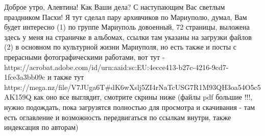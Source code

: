  
 
 
 
 

Доброе утро, Алевтина! Как Ваши дела? С наступающим Вас светлым праздником
Пасхи! Я тут сделал пару архивчиков по Мариуполю, думал, Вам будет интересно
(1) по группе Мариуполь довоенный, 72 страницы, выложена здесь у меня на
страничке в альбомах, ссылки там указаны на загрузки файлов (2) в основном по
культурной жизни Мариуполя, но есть также и посты с прерасными фотографическими
работами, вот тут -
https://acrobat.adobe.com/id/urn:aaid:sc:EU:4ecce413-b27c-4216-9cd7-1fce3a3bb09c
и также тут
https://mega.nz/file/V7JUga6T#dK6wXslj5ZI4rNaTcUSG7R1M93QH3oa54O5c5AK159Q как
оно все выглядит, смотрите скрины ниже (файлы pdf большие !!!, нужно подождать,
пока загрузятся полностью для просмотра и скачивания - там есть оглавление и
возможность передвигаться по ссылкам внутри, также индексация по авторам)


